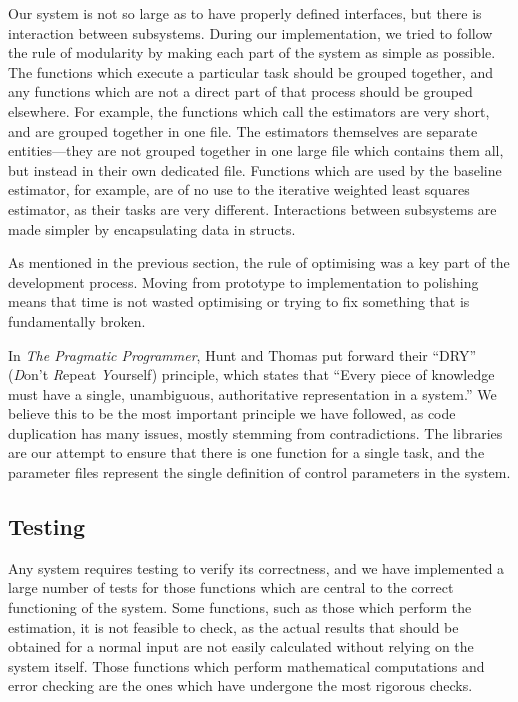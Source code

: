\documentclass[a4paper,11pt]{article}
\begin{document}
   Our system is not so large as to have properly defined interfaces, but there
   is interaction between subsystems. During our implementation, we tried to
   follow the rule of modularity by making each part of the system as simple as
   possible. The functions which execute a particular task should be grouped
   together, and any functions which are not a direct part of that process
   should be grouped elsewhere. For example, the functions which call the
   estimators are very short, and are grouped together in one file. The
   estimators themselves are separate entities---they are not grouped together
   in one large file which contains them all, but instead in their own dedicated
   file. Functions which are used by the baseline estimator, for example, are of
   no use to the iterative weighted least squares estimator, as their tasks are
   very different. Interactions between subsystems are made simpler by
   encapsulating data in structs.

   As mentioned in the previous section, the rule of optimising was a key part
   of the development process. Moving from prototype to implementation to
   polishing means that time is not wasted optimising or trying to fix something
   that is fundamentally broken.

   In \emph{The Pragmatic Programmer}, Hunt and Thomas put forward their ``DRY''
   (\emph{D}on't \emph{R}epeat \emph{Y}ourself) principle, which states that
   ``Every piece of knowledge must have a single, unambiguous, authoritative
   representation in a system.'' We believe this to be the most important
   principle we have followed, as code duplication has many issues, mostly
   stemming from contradictions. The libraries are our attempt to ensure that
   there is one function for a single task, and the parameter files represent
   the single definition of control parameters in the system.
\subsection{Testing}
\label{sec-7-3}

   Any system requires testing to verify its correctness, and we have
   implemented a large number of tests for those functions which are central to
   the correct functioning of the system. Some functions, such as those which
   perform the estimation, it is not feasible to check, as the actual results
   that should be obtained for a normal input are not easily calculated without
   relying on the system itself. Those functions which perform mathematical
   computations and error checking are the ones which have undergone the most
   rigorous checks.
\end{document}
